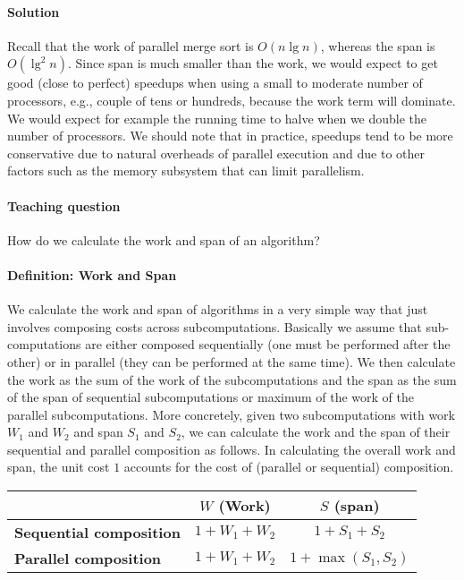 \paragraph{Solution}
Recall that the work of parallel merge sort is $O(n\lg{n})$, whereas
the span is $O(\lg^2{n})$.  
%
Since span is much smaller than the work, we would expect to get good
(close to perfect) speedups when using a small to moderate number of
processors, e.g., couple of tens or hundreds, because the work term
will dominate.
%
We would expect for example the running time to halve when we double
the number of processors.
%
We should note that in practice, speedups tend to be more conservative
due to natural overheads of parallel execution and due to other
factors such as the memory subsystem that can limit parallelism.

\paragraph{Teaching question}
How do we calculate the work and span of an algorithm?


\paragraph{Definition: Work and Span}
We calculate the work and span of algorithms in a very
simple way that just involves composing costs across subcomputations.
%
Basically we assume that sub-computations are either composed
sequentially (one must be performed after the other) or in parallel
(they can be performed at the same time).
%
We then calculate the work as the sum of the work of the
subcomputations and the span as the sum of the span of sequential
subcomputations or maximum of the work of the parallel
subcomputations.
%
More concretely, given two subcomputations with work $W_1$ and $W_2$
and span $S_1$ and $S_2$, we can calculate the work and the span of
their sequential and parallel composition as follows.
%
In calculating the overall work and span, the unit cost $1$ accounts
for the cost of (parallel or sequential) composition.


\begin{center}
\renewcommand{\arraystretch}{1.5}
\begin{tabular}{lcc}
\toprule
                          &  \bf $W$ (Work) & \bf $S$ (span)\\
\midrule
\bf Sequential composition & $1 + W_1 + W_2$ & $1 + S_1+ S_2$\\
\midrule
\bf Parallel composition   & $1 + W_1 + W_2$ & $1 + \max(S_1, S_2)$\\
\bottomrule
\end{tabular}
\end{center}

